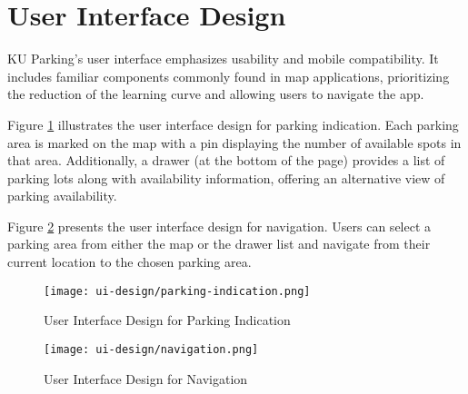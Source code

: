 




\section{User Interface Design}
\label{section:user-interface-design}
KU Parking's user interface emphasizes usability and mobile compatibility. It includes familiar components commonly found in map applications, prioritizing the reduction of the learning curve and allowing users to navigate the app. 

Figure \ref{fig:ui_parking_indication} illustrates the user interface design for parking indication. Each parking area is marked on the map with a pin displaying the number of available spots in that area. Additionally, a drawer (at the bottom of the page) provides a list of parking lots along with availability information, offering an alternative view of parking availability.

Figure \ref{fig:ui_navigation} presents the user interface design for navigation. Users can select a parking area from either the map or the drawer list and navigate from their current location to the chosen parking area.

\begin{figure}[h]
    \centering
    \texttt{[image: ui-design/parking-indication.png]}
    \caption{User Interface Design for Parking Indication}
    \label{fig:ui_parking_indication}
\end{figure}

\begin{figure}[h]
    \centering
    \texttt{[image: ui-design/navigation.png]}
    \caption{User Interface Design for Navigation}
    \label{fig:ui_navigation}
\end{figure}
